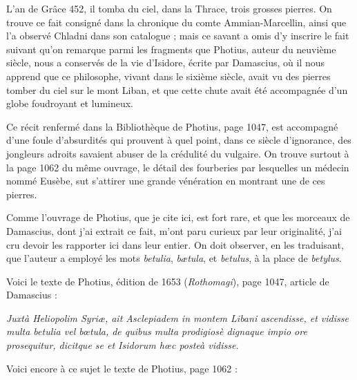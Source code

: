 \documentclass[a4paper, 12pt, oneside, french]{article}
\begin{document}
L'an de Grâce 452, il tomba du ciel, dans la Thrace, trois grosses pierres. On trouve ce fait consigné dans la chronique du comte Ammian-Marcellin, ainsi que l'a observé Chladni dans son catalogue ; mais ce savant a omis d'y inscrire le fait suivant qu'on remarque parmi les fragments que Photius, auteur du neuvième siècle, nous a conservés de la vie d'Isidore, écrite par Damascius, où il nous apprend que ce philosophe, vivant dans le sixième siècle, avait vu des pierres tomber du ciel sur le mont Liban, et que cette chute avait été accompagnée d'un globe foudroyant et lumineux.

Ce récit renfermé dans la Bibliothèque de Photius, page 1047, est accompagné d'une foule d'absurdités qui prouvent à quel point, dans ce siècle d'ignorance, des jongleurs adroits savaient abuser de la crédulité du vulgaire. On trouve surtout à la page 1062 du même ouvrage, le détail des fourberies par lesquelles un médecin nommé Eusèbe, sut s'attirer une grande vénération en montrant une de ces pierres.

Comme l'ouvrage de Photius, que je cite ici, est fort rare, et que les morceaux de Damascius, dont j'ai extrait ce fait, m'ont paru curieux par leur originalité, j'ai cru devoir les rapporter ici dans leur entier. On doit observer, en les traduisant, que l'auteur a employé les mots \emph{betulia}, \emph{bætula}, et \emph{betulus}, à la place de \emph{betylus}.

Voici le texte de Photius, édition de 1653 (\emph{Rothomagi}), page 1047, article de Damascius :

\og \emph{Juxtà Heliopolim Syriæ, ait Asclepiadem in montem Libani ascendisse, et vidisse multa betulia vel bœtula, de quibus multa prodigiosè dignaque impio ore prosequitur, dicitque se et Isidorum hœc posteà vidisse.} \fg

Voici encore à ce sujet le texte de Photius, page 1062 :
\end{document}
